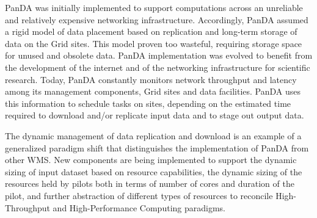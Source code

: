 PanDA was initially implemented to support computations across an unreliable and
relatively expensive networking infrastructure. Accordingly, PanDA assumed a
rigid model of data placement based on replication and long-term storage of data
on the Grid sites. This model proven too wasteful, requiring storage space for
unused and obsolete data. PanDA implementation was evolved to benefit from the
development of the internet and of the networking infrastructure for scientific
research. Today, PanDA constantly monitors network throughput and latency  among
its management components, Grid sites and data facilities. PanDA uses this
information to schedule tasks on sites, depending on the estimated time required
to download and/or replicate input data and to stage out output data.

The dynamic management of data replication and download is an example of a
generalized paradigm shift that distinguishes the implementation of PanDA from
other WMS. New components are being implemented to support the dynamic sizing of
input dataset based on resource capabilities, the dynamic sizing of the
resources held by pilots both in terms of number of cores and duration of the
pilot, and further abstraction of different types of resources to reconcile
High-Throughput and High-Performance Computing paradigms.

%



